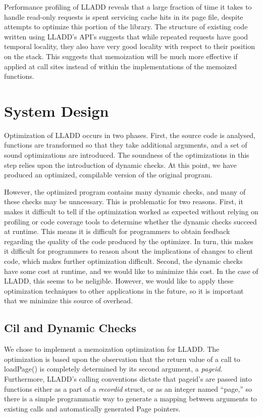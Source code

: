 \documentclass[10pt,letterpaper,twocolumn,english]{article}
\newcommand{\yad}{LLADD\xspace}
\newcommand{\pin}{loadPage()\xspace}
\begin{document}
Performance profiling of \yad reveals that a large fraction of time it
takes to handle read-only requests is spent servicing cache hits in
its page file, despite attempts to optimize this portion of the
library.  The structure of existing code written using \yad's API's
suggests that while repeated requests have good temporal locality,
they also have very good locality with respect to their position on
the stack.  This suggests that memoization will be much more effective
if applied at call sites instead of within the implementations of the
memoized functions.


\section{System Design}

Optimization of \yad occurs in two phases.  First, the source code is
analysed, functions are transformed so that they take additional
arguments, and a set of sound optimizations are introduced.  The
soundness of the optimizations in this step relies upon the
introduction of dynamic checks.  At this point, we have produced an
optimized, compilable version of the original program.

However, the optimized program contains many dynamic checks, and many
of these checks may be unncessary.  This is problematic for two
reasons.  First, it makes it difficult to tell if the optimization
worked as expected without relying on profiling or code coverage tools
to determine whether the dynamic checks succeed at runtime.  This
means it is difficult for programmers to obtain feedback regarding the
quality of the code produced by the optimizer.  In turn, this makes it
difficult for programmers to reason about the implications of changes
to client code, which makes further optimization difficult.  Second,
the dynamic checks have some cost at runtime, and we would like to
minimize this cost.  In the case of \yad, this seems to be neligible.
However, we would like to apply these optimization techniques to other
applications in the future, so it is important that we minimize this
source of overhead.

\subsection{Cil and Dynamic Checks}

We chose to implement a memoization optimization for \yad.  The
optimization is based upon the observation that the return value of a
call to \pin is completely determined by its second argument, a {\em
pageid}.  Furthermore, \yad's calling conventions dictate that
pageid's are passed into functions either as a part of a {\em
recordid} struct, or as an integer named ``page,'' so there is a
simple programmatic way to generate a mapping between arguments to
existing calls and automatically generated Page pointers.
\end{document}
